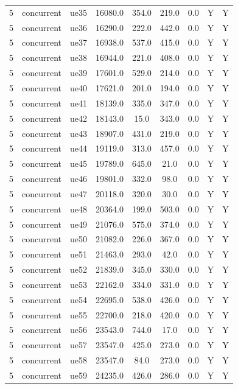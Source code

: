 \begin{table}[ht]
\begin{tabular}{|c|c|c|c|c|c|c|c|c|}
5 & concurrent & ue35 & 16080.0 & 354.0 & 219.0 & 0.0 & Y & Y \\
5 & concurrent & ue36 & 16290.0 & 222.0 & 442.0 & 0.0 & Y & Y \\
5 & concurrent & ue37 & 16938.0 & 537.0 & 415.0 & 0.0 & Y & Y \\
5 & concurrent & ue38 & 16944.0 & 221.0 & 408.0 & 0.0 & Y & Y \\
5 & concurrent & ue39 & 17601.0 & 529.0 & 214.0 & 0.0 & Y & Y \\
5 & concurrent & ue40 & 17621.0 & 201.0 & 194.0 & 0.0 & Y & Y \\
5 & concurrent & ue41 & 18139.0 & 335.0 & 347.0 & 0.0 & Y & Y \\
5 & concurrent & ue42 & 18143.0 & 15.0 & 343.0 & 0.0 & Y & Y \\
5 & concurrent & ue43 & 18907.0 & 431.0 & 219.0 & 0.0 & Y & Y \\
5 & concurrent & ue44 & 19119.0 & 313.0 & 457.0 & 0.0 & Y & Y \\
5 & concurrent & ue45 & 19789.0 & 645.0 & 21.0 & 0.0 & Y & Y \\
5 & concurrent & ue46 & 19801.0 & 332.0 & 98.0 & 0.0 & Y & Y \\
5 & concurrent & ue47 & 20118.0 & 320.0 & 30.0 & 0.0 & Y & Y \\
5 & concurrent & ue48 & 20364.0 & 199.0 & 503.0 & 0.0 & Y & Y \\
5 & concurrent & ue49 & 21076.0 & 575.0 & 374.0 & 0.0 & Y & Y \\
5 & concurrent & ue50 & 21082.0 & 226.0 & 367.0 & 0.0 & Y & Y \\
5 & concurrent & ue51 & 21463.0 & 293.0 & 42.0 & 0.0 & Y & Y \\
5 & concurrent & ue52 & 21839.0 & 345.0 & 330.0 & 0.0 & Y & Y \\
5 & concurrent & ue53 & 22162.0 & 334.0 & 331.0 & 0.0 & Y & Y \\
5 & concurrent & ue54 & 22695.0 & 538.0 & 426.0 & 0.0 & Y & Y \\
5 & concurrent & ue55 & 22700.0 & 218.0 & 420.0 & 0.0 & Y & Y \\
5 & concurrent & ue56 & 23543.0 & 744.0 & 17.0 & 0.0 & Y & Y \\
5 & concurrent & ue57 & 23547.0 & 425.0 & 273.0 & 0.0 & Y & Y \\
5 & concurrent & ue58 & 23547.0 & 84.0 & 273.0 & 0.0 & Y & Y \\
5 & concurrent & ue59 & 24235.0 & 426.0 & 286.0 & 0.0 & Y & Y \\

\end{tabular}
\end{table}
